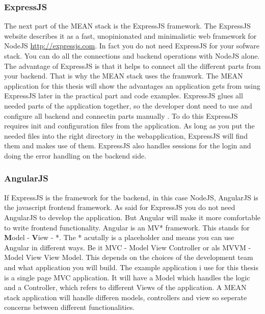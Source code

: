 \subsubsection{ExpressJS}
The next part of the MEAN stack is the ExpressJS framework. The ExpressJS website describes it as a fast, unopinionated and minimalistic web framework
for NodeJS \url{http://expressjs.com}. In fact you do not need ExpressJS for your sofware stack. You can do all the connections and backend operations with
NodeJS alone. The advantage of ExpressJS is that it helps to connect all the different parts from your backend. That is why the MEAN stack uses the framwork.
The MEAN application for this thesis will show the advantages an application gets from using ExpressJS later in the practical part and code examples.
ExpressJS glues all needed parts of the application together, so the developer dont need to use and configure all backend and connectin parts manually
\cite{brown2014web}. To do this ExpressJS requires init and configuration files from the application. As long as you put the needed files into the right
directory in the webapplication, ExpressJS will find them and makes use of them. ExpressJS also handles sessions for the login and doing the error handling
on the backend side.

\subsubsection{AngularJS}
If ExpressJS is the framework for the backend, in this case NodeJS, AngularJS is the javascript frontend framework. As said for ExpressJS you do not need
AngularJS to develop the application. But Angular will make it more comfortable to write frontend functionality. Angular is an MV* framework. This stands
for \textbf{M}odel - \textbf{V}iew - *. The * acutally is a placeholder and means you can use Angular in different ways. Be it MVC - Model View Controller
or als MVVM - Model View View Model. This depends on the choices of the development team and what application you will build. The example application i
use for this thesis is a single page MVC application. It will have a Model which handles the logic and a Controller, which refers to different Views of
the application. A MEAN stack application will handle differen models, controllers and view so seperate concerns between different functionalities.

